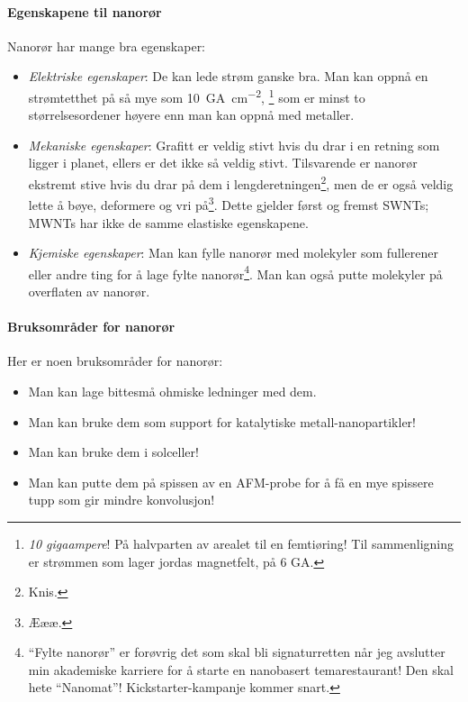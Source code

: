 \paragraph{Egenskapene til nanorør} Nanorør har mange bra egenskaper:
\begin{itemize}
	\item \emph{Elektriske egenskaper}: De kan lede strøm ganske bra. Man kan oppnå en strømtetthet på så mye som \SI{10}{\giga\ampere\per\centi\meter\squared}, \footnote{\emph{10 gigaampere}! På halvparten av arealet til en femtiøring! Til sammenligning er strømmen som lager jordas magnetfelt, på 6 GA.} som er minst to størrelsesordener høyere enn man kan oppnå med metaller.
	\item \emph{Mekaniske egenskaper}: Grafitt er veldig stivt hvis du drar i en retning som ligger i planet, ellers er det ikke så veldig stivt. Tilsvarende er nanorør ekstremt stive hvis du drar på dem i lengderetningen\footnote{Knis.}, men de er også veldig lette å bøye, deformere og vri på\footnote{Æææ.}. Dette gjelder først og fremst SWNTs; MWNTs har ikke de samme elastiske egenskapene.
	\item \emph{Kjemiske egenskaper}: Man kan fylle nanorør med molekyler som fullerener eller andre ting for å lage fylte nanorør\footnote{``Fylte nanorør'' er forøvrig det som skal bli signaturretten når jeg avslutter min akademiske karriere for å starte en nanobasert temarestaurant! Den skal hete ``Nanomat''! Kickstarter-kampanje kommer snart.}. Man kan også putte molekyler på overflaten av nanorør.
\end{itemize}

\paragraph{Bruksområder for nanorør} Her er noen bruksområder for nanorør:
\begin{itemize}
	\item Man kan lage bittesmå ohmiske ledninger med dem.
	\item Man kan bruke dem som support for katalytiske metall-nanopartikler!
	\item Man kan bruke dem i solceller!
	\item Man kan putte dem på spissen av en AFM-probe for å få en mye spissere tupp som gir mindre konvolusjon!
\end{itemize}